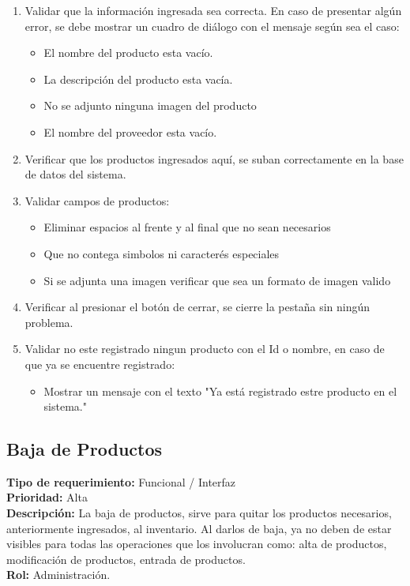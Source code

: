 \documentclass[a4paper,DIV=12]{scrreprt}
\begin{document}
\begin{enumerate}

	\item{Validar que la información ingresada sea correcta. En caso de presentar algún error, se debe mostrar un cuadro de diálogo con el mensaje según sea el caso: }
	
	\begin{itemize}
		\item{El nombre del producto esta vacío. }
		\item{La descripción del producto esta vacía.}
		\item{No se adjunto ninguna imagen del producto}
		\item{El nombre del proveedor esta vacío.}
	\end{itemize}
	\item{Verificar que los productos ingresados aquí, se suban correctamente en la base de datos del sistema.}
	\item{Validar campos de productos:}
	\begin{itemize}
		\item {Eliminar espacios al frente y al final que no sean necesarios}
		\item {Que no contega simbolos ni caracterés especiales}
		\item {Si se adjunta una imagen verificar que sea un formato de imagen valido}
	\end{itemize}
	
	\item{Verificar al presionar el botón de cerrar, se cierre la pestaña sin ningún problema. }
	\item{Validar no este registrado ningun producto con el Id o nombre, en caso de que ya se encuentre registrado:}
	\begin{itemize}
		\item {Mostrar un mensaje con el texto "Ya está registrado estre producto en el sistema."}
	\end{itemize} 
\end{enumerate}

\newpage
\setcounter{subsection}{-1}
\setcounter{chapter}{1}
\setcounter{section}{2}
\subsection{Baja de Productos}
\noindent
\textbf{Tipo de requerimiento:} Funcional / Interfaz\\
\textbf{Prioridad:} Alta\\
\textbf{Descripción:} La baja de productos, sirve para quitar los productos necesarios, anteriormente ingresados, al inventario. Al darlos de baja, ya no deben de estar visibles para todas las operaciones que los involucran como: alta de productos, modificación de productos, entrada de productos.\\
\textbf{Rol:} Administración.
\end{document}
